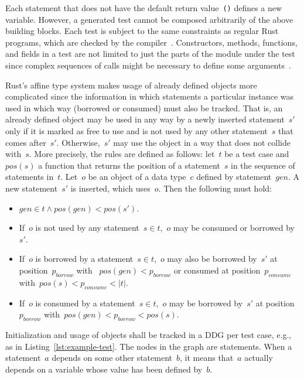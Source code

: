 \documentclass{article}
\begin{document}
Each statement that does not have the default return value~\lstinline{()} defines a new variable. However, a generated test cannot be composed arbitrarily of the above building blocks. Each test is subject to the same constraints as regular Rust programs, which are checked by the compiler~\cite{Tonella2004}. Constructors, methods, functions, and fields in a test are not limited to just the parts of the module under the test since complex sequences of calls might be necessary to define some arguments~\cite{Fraser2012}. 

Rust's affine type system makes usage of already defined objects more complicated since the information in which statements a particular instance was used in which way (borrowed or consumed) must also be tracked. That is, an already defined object may be used in any way by a newly inserted statement~$s'$ only if it is marked as free to use and is not used by any other statement~$s$ that comes after~$s'$. Otherwise,~$s'$ may use the object in a way that does not collide with~$s$. More precisely, the rules are defined as follows: let~$t$ be a test case and $pos(s)$ a function that returns the position of a statement~$s$ in the sequence of statements in~$t$. Let~$o$ be an object of a data type~$c$ defined by statement~$gen$. A new statement~$s'$ is inserted, which uses~$o$. Then the following must hold:
\begin{itemize}
    \item $gen \in t \wedge pos(gen) < pos(s')$.
    \item If~$o$ is not used by any statement~$s \in t$,~$o$ may be consumed or borrowed by~$s'$. 
    \item If~$o$ is borrowed by a statement~$s \in t$,~$o$ may also be borrowed by~$s'$ at position~$p_{borrow}$ with ~$pos(gen) < p_{borrow}$ or consumed at position~$p_{consume}$ with~$pos(s) < p_{consume} < \left|t\right|$. 
    \item If~$o$ is consumed by a statement~$s \in t$,~$o$ may be borrowed by~$s'$ at position~$p_{borrow}$ with~$pos(gen) < p_{borrow} < pos(s)$. 
\end{itemize}

Initialization and usage of objects shall be tracked in a \ac{DDG} per test case, e.g., as in Listing~\ref{lst:example-test}. The nodes in the graph are statements. When a statement~$a$ depends on some other statement~$b$, it means that~$a$ actually depends on a variable whose value has been defined by~$b$. 
\end{document}

